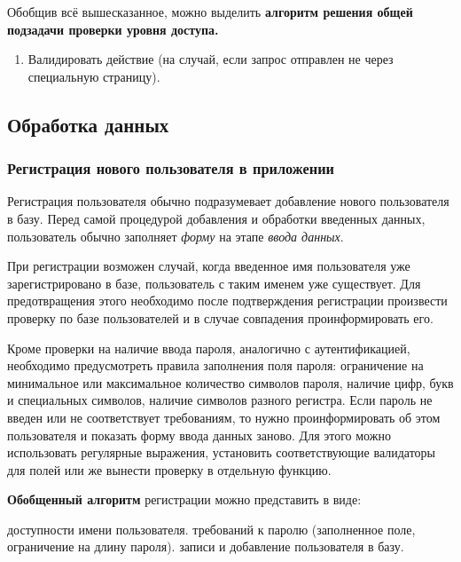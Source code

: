 \documentclass[a4paper]{article}
\begin{document}
Обобщив всё вышесказанное, можно выделить \textbf{алгоритм решения общей подзадачи проверки уровня доступа.}

\begin{enumerate}
 из глобальной переменной пользователя значение переменной уровня доступа.
 зависимости от значения данной переменной отобразить необходимые компоненты.
\item Валидировать действие (на случай, если запрос отправлен не через специальную страницу).
\end{enumerate}

\subsection{Обработка данных}

\subsubsection{Регистрация нового пользователя в приложении}

Регистрация пользователя обычно подразумевает добавление нового пользователя в базу. Перед самой процедурой добавления и обработки введенных данных, пользователь обычно заполняет \textit{форму} на этапе \textit{ввода данных}.

При регистрации возможен случай, когда введенное имя пользователя уже зарегистрировано в базе, пользователь с таким именем уже существует. Для предотвращения этого необходимо после подтверждения регистрации произвести проверку по базе пользователей и в случае совпадения проинформировать его.

Кроме проверки на наличие ввода пароля, аналогично с аутентификацией, необходимо предусмотреть правила заполнения поля пароля: ограничение на минимальное или максимальное количество символов пароля, наличие цифр, букв и специальных символов, наличие символов разного регистра. Если пароль не введен или не соответствует требованиям, то нужно проинформировать об этом пользователя и показать форму ввода данных заново. Для этого можно использовать регулярные выражения, установить соответствующие валидаторы для полей или же вынести проверку в отдельную функцию.

\textbf{Обобщенный алгоритм} регистрации можно представить в виде:

\begin{enumerate}
 доступности имени пользователя.
 требований к паролю (заполненное поле, ограничение на длину пароля).
 записи и добавление пользователя в базу.
\end{enumerate}
\end{document}
